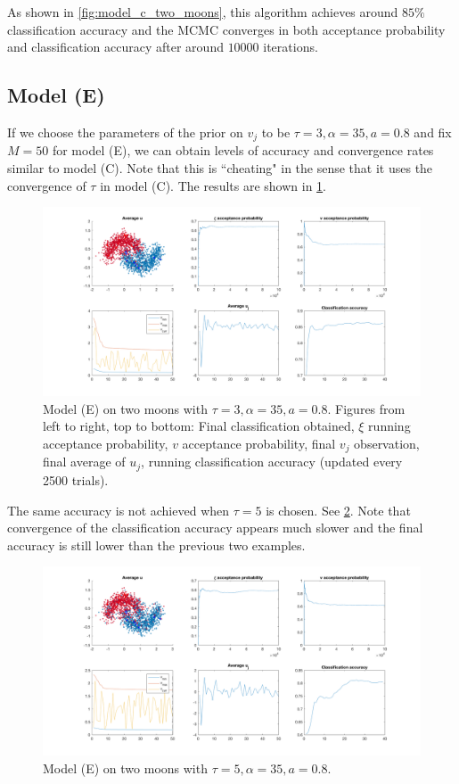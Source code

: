 \documentclass{siamart1116}
\begin{document}
        As shown in \cref{fig:model_c_two_moons}, this algorithm achieves around $85\%$ classification accuracy and the MCMC converges in both acceptance probability and classification accuracy after around $10000$ iterations.
    \subsection{Model (E)}
        If we choose the parameters of the prior on $v_j$ to be $\tau = 3, \alpha = 35, a=0.8$ and fix $M=50$ for model (E), we can obtain levels of accuracy and convergence rates similar to model (C). Note that this is ``cheating" in the sense that it uses the convergence of $\tau$ in model (C). The results are shown in \cref{fig:model_e_two_moons_t=3}.

        \begin{figure}[!htb]
            \caption{\label{fig:model_e_two_moons_t=3}Model (E) on two moons with $\tau=3,\alpha=35,a=0.8$. Figures from left to right, top to bottom: Final classification obtained, $\xi$ running acceptance probability, $v$ acceptance probability, final $v_j$ observation, final average of $u_j$, running classification accuracy (updated every 2500 trials).}
            \includegraphics[width=\linewidth]{moons/learn_v/t=3.png}
        \end{figure}

        The same accuracy is not achieved when $\tau=5$ is chosen. See \cref{fig:model_e_two_moons_t=5}. Note that convergence of the classification accuracy appears much slower and the final accuracy is still lower than the previous two examples.

        \begin{figure}[!htb]
            \caption{\label{fig:model_e_two_moons_t=5}Model (E) on two moons with $\tau=5,\alpha=35,a=0.8$.}
            \includegraphics[width=\linewidth]{moons/learn_v/t=5.png}
        \end{figure}
\end{document}
